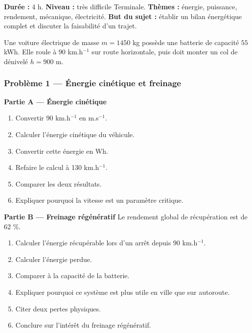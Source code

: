 \documentclass[11pt,a4paper]{article}
\begin{document}
\hypertarget{PC-EXCELLENCE-01}{}
\begin{difficile}
\textbf{Durée :} 4 h.  
\textbf{Niveau :} très difficile Terminale.  
\textbf{Thèmes :} énergie, puissance, rendement, mécanique, électricité.  
\textbf{But du sujet :} établir un bilan énergétique complet et discuter la faisabilité d'un trajet.

\medskip

Une voiture électrique de masse $m=1450$ kg possède une batterie de capacité $55$ kWh. Elle roule à 90 km.h$^{-1}$ sur route horizontale, puis doit monter un col de dénivelé $h=900$ m.

\subsubsection*{Problème 1 — Énergie cinétique et freinage}

\textbf{Partie A — Énergie cinétique}
\begin{enumerate}
  \item Convertir 90 km.h$^{-1}$ en m.s$^{-1}$.
  \item Calculer l'énergie cinétique du véhicule.
  \item Convertir cette énergie en Wh.
  \item Refaire le calcul à 130 km.h$^{-1}$.
  \item Comparer les deux résultats.
  \item Expliquer pourquoi la vitesse est un paramètre critique.
\end{enumerate}

\textbf{Partie B — Freinage régénératif}
Le rendement global de récupération est de 62 \%.
\begin{enumerate}
  \item Calculer l'énergie récupérable lors d'un arrêt depuis 90 km.h$^{-1}$.
  \item Calculer l'énergie perdue.
  \item Comparer à la capacité de la batterie.
  \item Expliquer pourquoi ce système est plus utile en ville que sur autoroute.
  \item Citer deux pertes physiques.
  \item Conclure sur l'intérêt du freinage régénératif.
\end{enumerate}


\end{difficile}
\end{document}
